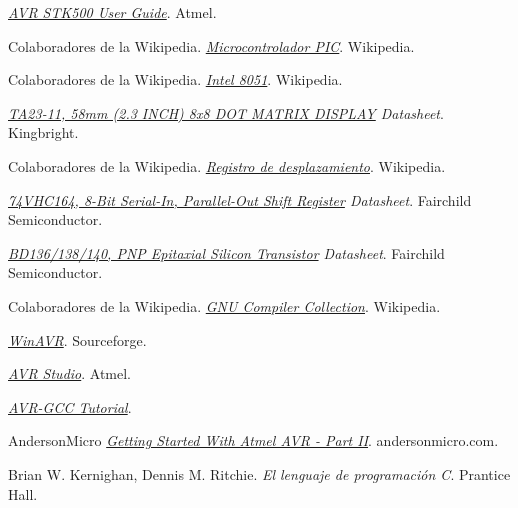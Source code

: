 \begin{thebibliography}{15}
  \emph{\href{http://www.atmel.com/dyn/resources/prod_documents/doc1925.pdf}{AVR STK500 User Guide}}.
  Atmel.

  Colaboradores de la Wikipedia.
  \emph{\href{http://es.wikipedia.org/wiki/Microcontrolador_PIC}{Microcontrolador PIC}}.
  Wikipedia.

  Colaboradores de la Wikipedia.
  \emph{\href{http://es.wikipedia.org/wiki/Intel_8051}{Intel 8051}}.
  Wikipedia.

  \emph{\href{http://www.kingbright.com/manager/upload/pdf/TA23-11SEKWA(Ver.2).pdf}{TA23-11, 58mm (2.3 INCH) 8x8 DOT MATRIX DISPLAY} Datasheet}.
  Kingbright.

  Colaboradores de la Wikipedia.
  \emph{\href{http://es.wikipedia.org/wiki/Registro_de_desplazamiento}{Registro de desplazamiento}}.
  Wikipedia.

  \emph{\href{http://www.fairchildsemi.com/ds/74/74VHC164.pdf}{74VHC164, 8-Bit Serial-In, Parallel-Out Shift Register} Datasheet}.
  Fairchild Semiconductor.

  \emph{\href{http://www.fairchildsemi.com/ds/BD/BD140.pdf}{BD136/138/140, PNP Epitaxial Silicon Transistor} Datasheet}.
  Fairchild Semiconductor.

  Colaboradores de la Wikipedia.
  \emph{\href{http://es.wikipedia.org/wiki/GNU_Compiler_Collection}{GNU Compiler Collection}}.
  Wikipedia.

  \emph{\href{http://winavr.sourceforge.net/}{WinAVR}}.
  Sourceforge.

  \emph{\href{http://www.atmel.com/dyn/products/tools_card.asp?tool_id=2725&source=redirect}{AVR Studio}}.
  Atmel.

  \emph{\href{http://winavr.scienceprog.com/avr-gcc-tutorial/}{AVR-GCC Tutorial}}.
  
  AndersonMicro 
  \emph{\href{http://andersonmicro.com/2009/getting-started-with-atmel-avr-part-ii/}{Getting Started With Atmel AVR - Part II}}.
  andersonmicro.com.

  Brian W. Kernighan, Dennis M. Ritchie.
  \emph{El lenguaje de programación C}.
  Prantice Hall.

\end{thebibliography}
